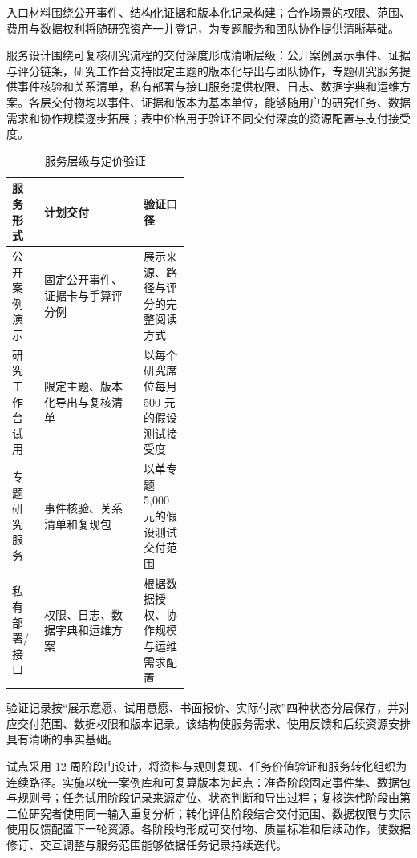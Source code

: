 入口材料围绕公开事件、结构化证据和版本化记录构建；合作场景的权限、范围、费用与数据权利将随研究资产一并登记，为专题服务和团队协作提供清晰基础。


服务设计围绕可复核研究流程的交付深度形成清晰层级：公开案例展示事件、证据与评分链条，研究工作台支持限定主题的版本化导出与团队协作，专题研究服务提供事件核验和关系清单，私有部署与接口服务提供权限、日志、数据字典和运维方案。各层交付物均以事件、证据和版本为基本单位，能够随用户的研究任务、数据需求和协作规模逐步拓展；表中价格用于验证不同交付深度的资源配置与支付接受度。

\begin{table}[!htbp]
\centering
\caption{服务层级与定价验证}
\label{tab:wty-pricing-plan}
\small
\begin{tabularx}{\linewidth}{p{0.18\linewidth}X p{0.26\linewidth}}
\toprule
服务形式 & 计划交付 & 验证口径 \\
\midrule
公开案例演示 & 固定公开事件、证据卡与手算评分例 & 展示来源、路径与评分的完整阅读方式 \\
研究工作台试用 & 限定主题、版本化导出与复核清单 & 以每个研究席位每月 500 元的假设测试接受度 \\
专题研究服务 & 事件核验、关系清单和复现包 & 以单专题 5,000 元的假设测试交付范围 \\
私有部署/接口 & 权限、日志、数据字典和运维方案 & 根据数据授权、协作规模与运维需求配置 \\
\bottomrule
\end{tabularx}
\end{table}

验证记录按“展示意愿、试用意愿、书面报价、实际付款”四种状态分层保存，并对应交付范围、数据权限和版本记录。该结构使服务需求、使用反馈和后续资源安排具有清晰的事实基础。


试点采用 12 周阶段门设计，将资料与规则复现、任务价值验证和服务转化组织为连续路径。实施以统一案例库和可复算版本为起点：准备阶段固定事件集、数据包与规则号；任务试用阶段记录来源定位、状态判断和导出过程；复核迭代阶段由第二位研究者使用同一输入重复分析；转化评估阶段结合交付范围、数据权限与实际使用反馈配置下一轮资源。各阶段均形成可交付物、质量标准和后续动作，使数据修订、交互调整与服务范围能够依据任务记录持续迭代。

